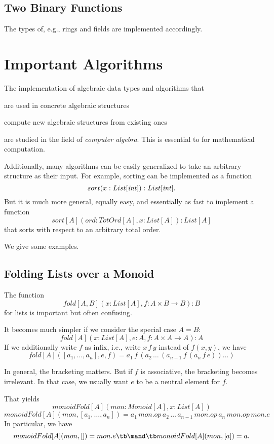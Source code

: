 \subsection{Two Binary Functions}

The types of, e.g., rings and fields are implemented accordingly.

\section{Important Algorithms}

The implementation of algebraic data types and algorithms that
\begin{compactitem}
 \item are used in concrete algebraic structures
 \item compute new algebraic structures from existing ones
\end{compactitem}
are studied in the field of \emph{computer algebra}.
This is essential to for mathematical computation.
\medskip

Additionally, many algorithms can be easily generalized to take an arbitrary structure as their input.
For example, sorting can be implemented as a function \[sort(x:List[\mathit{int}]):List[\mathit{int}].\]
But it is much more general, equally easy, and essentially as fast to implement a function \[sort[A](ord: TotOrd[A], x:List[A]):List[A]\] that sorts with respect to an arbitrary total order.

We give some examples.

\subsection{Folding Lists over a Monoid}

The function \[fold[A,B](x:List[A], f: A\times B\to B): B\] for lists is important but often confusing.

It becomes much simpler if we consider the special case $A=B$:
\[fold[A](x:List[A], e: A, f: A\times A\to A): A\]
If we additionally write $f$ as infix, i.e., write $x\,f\,y$ instead of $f(x,y)$, we have
\[fold[A]([a_1,\ldots,a_n],e,f)=a_1\,f\,(a_2\,\ldots\,(a_{n-1}\,f\,(a_n\,f\, e))\ldots)\]

In general, the bracketing matters.
But if $f$ is associative, the bracketing becomes irrelevant.
In that case, we usually want $e$ to be a neutral element for $f$.

That yields
\[monoidFold[A](mon:Monoid[A], x:List[A])\]
\[monoidFold[A](mon, [a_1,\ldots,a_n])=a_1\,mon.op\,a_2\,\ldots\,a_{n-1}\,mon.op\,a_n\,mon.op\, mon.e\]
In particular, we have
\[monoidFold[A](mon, [])=mon.e \tb\mand\tb monoidFold[A](mon, [a])=a.\]

